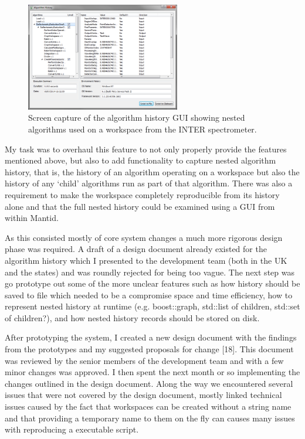 \documentclass[paper=a4, fontsize=11pt]{scrartcl}	%
\numberwithin{equation}{section}															%
\numberwithin{figure}{section}																%
\numberwithin{table}{section}
\begin{document}
\begin{figure}[H]
\centering
\includegraphics[width=0.6\textwidth]{img/algorithm-history.png}
\caption{Screen capture of the algorithm history GUI showing nested algorithms used on a workspace from the INTER spectrometer.}
\label{fig:algorithm-history}
\end{figure}

My task was to overhaul this feature to not only properly provide the
features mentioned above, but also to add functionality to capture
nested algorithm history, that is, the history of an algorithm operating
on a workspace but also the history of any `child' algorithms run as part
of that algorithm. There was also a requirement to make the workspace
completely reproducible from its history alone and that the full nested
history could be examined using a GUI from within Mantid.

As this consisted mostly of core system changes a much more rigorous
design phase was required. A draft of a design document already existed
for the algorithm history which I presented to the development team
(both in the UK and the states) and was roundly rejected for being too
vague. The next step was go prototype out some of the more unclear
features such as how history should be saved to file which needed to be
a compromise space and time efficiency, how to represent nested history
at runtime (e.g. boost::graph, std::list of children, std::set of children?),
and how nested history records should be stored on disk.

After prototyping the system, I created a new design document with the
findings from the prototypes and my suggested proposals for change
{[}18{]}. This document was reviewed by the senior members of the
development team and with a few minor changes was approved. I then spent
the next month or so implementing the changes outlined in the design
document. Along the way we encountered several issues that were not
covered by the design document, mostly linked technical issues caused by
the fact that workspaces can be created without a string name and that providing a temporary name to them on the fly can causes many
issues with reproducing a executable script.
\end{document}
